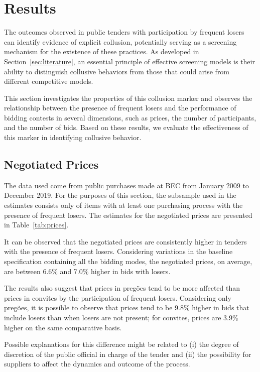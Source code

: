 \section{Results}
\label{sec:results}

The outcomes observed in public tenders with participation by frequent losers can identify evidence of explicit collusion, potentially serving as a screening mechanism for the existence of these practices. As developed in Section~\ref{sec:literature}, an essential principle of effective screening models is their ability to distinguish collusive behaviors from those that could arise from different competitive models.

This section investigates the properties of this collusion marker and observes the relationship between the presence of frequent losers and the performance of bidding contests in several dimensions, such as prices, the number of participants, and the number of bids. Based on these results, we evaluate the effectiveness of this marker in identifying collusive behavior.

\subsection{Negotiated Prices}

The data used come from public purchases made at BEC from January 2009 to December 2019. For the purposes of this section, the subsample used in the estimates consists only of items with at least one purchasing process with the presence of frequent losers. The estimates for the negotiated prices are presented in Table~\ref{tab:prices}.



It can be observed that the negotiated prices are consistently higher in tenders with the presence of frequent losers. Considering variations in the baseline specification containing all the bidding modes, the negotiated prices, on average, are between 6.6\% and 7.0\% higher in bids with losers.

The results also suggest that prices in preg\~{o}es tend to be more affected than prices in convites by the participation of frequent losers. Considering only preg\~{o}es, it is possible to observe that prices tend to be 9.8\% higher in bids that include losers than when losers are not present; for convites, prices are 3.9\% higher on the same comparative basis.

Possible explanations for this difference might be related to (i) the degree of discretion of the public official in charge of the tender and (ii) the possibility for suppliers to affect the dynamics and outcome of the process.

